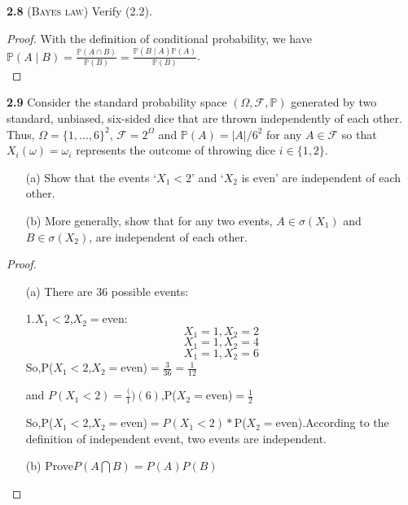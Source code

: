 \noindent\textbf{2.8}
\textsc{(Bayes law)} Verify (2.2).

\begin{proof}
    With the definition of conditional probability, we have $\mathbb{P}(A \mid B) = \frac{\mathbb{P}(A \cap B)}{\mathbb{P}(B)} = \frac{\mathbb{P}(B \mid A) \mathbb{P}(A)}{\mathbb{P}(B)}$. \\
\end{proof}

\noindent\textbf{2.9}
Consider the standard probability space $(\Omega,\mathcal{F},\mathbb{P})$ generated by two standard, unbiased, six-sided dice that are thrown independently of each other. Thus,
$\Omega=\{1, . . . , 6\}^2$, $\mathcal{F} = 2^{\Omega}$ and $\mathbb{P}(A) = |A|/6^2$ for any $A\in\mathcal{F}$ so that $X_i(\omega)=\omega_i$ represents the outcome of throwing dice $i\in\{1,2\}$.
\begin{enumerate}
    \item[(a)] Show that the events `$X_1 < 2$' and `$X_2$ is even' are independent of each other.
    \item[(b)] More generally, show that for any two events, $A\in \sigma(X_1)$ and $B\in \sigma(X_2)$, are independent of each other.
\end{enumerate}

\begin{proof}
\begin{enumerate}
    \item[(a)]There are 36 possible events:

1.$X_1 < 2$,$X_2=$even:
$$X_1=1,X_2=2$$
$$X_1=1,X_2=4$$
$$X_1=1,X_2=6$$
So,P($X_1 < 2$,$X_2=$even)$=\frac{3}{36} = \frac{1}{12}$

and $P(X_1 < 2)=\frac(1)(6)$,P($X_2=$even)$=\frac{1}{2} $

So,P($X_1 < 2$,$X_2=$even)$=P(X_1 < 2)*$P($X_2=$even).According to the definition of independent event, two events are independent.

\item[(b)]Prove$P(A\bigcap B)=P(A)P(B)$
\end{enumerate}
\end{proof}

